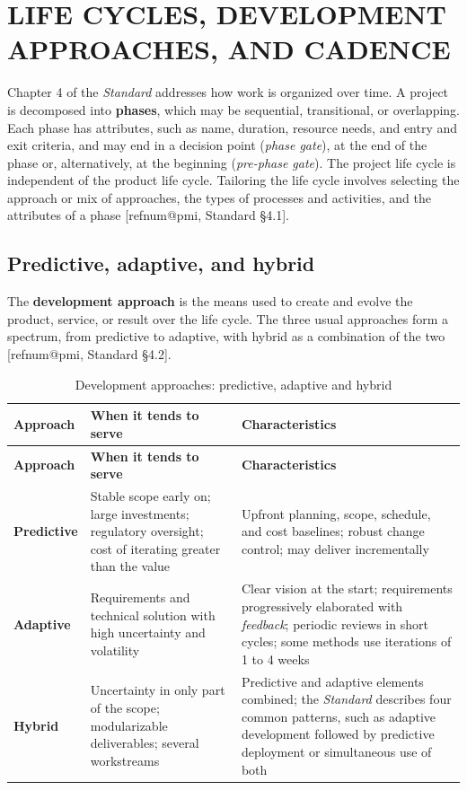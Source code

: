 \documentclass[12pt,a4paper,article,oneside,brazil,english]{abntex2}
\makeatletter
\newcommand{\fontetab}[1]{\par\vspace{3pt}{\small\noindent Source: #1\par}}
\newcommand{\refnum}[1]{\csname refnum@#1\endcsname}
\newcommand{\cit}[1]{[\refnum{#1}]}
\makeatother
\begin{document}
\section{LIFE CYCLES, DEVELOPMENT APPROACHES, AND CADENCE}

Chapter 4 of the \textit{Standard} addresses how work is organized over time. A project is decomposed into \textbf{phases}, which may be sequential, transitional, or overlapping. Each phase has attributes, such as name, duration, resource needs, and entry and exit criteria, and may end in a decision point (\textit{phase gate}), at the end of the phase or, alternatively, at the beginning (\textit{pre-phase gate}). The project life cycle is independent of the product life cycle. Tailoring the life cycle involves selecting the approach or mix of approaches, the types of processes and activities, and the attributes of a phase [\refnum{pmi}, Standard §4.1].
\subsection{Predictive, adaptive, and hybrid}

The \textbf{development approach} is the means used to create and evolve the product, service, or result over the life cycle. The three usual approaches form a spectrum, from predictive to adaptive, with hybrid as a combination of the two [\refnum{pmi}, Standard §4.2].

\begingroup\SingleSpacing\small
\begin{longtable}{@{}>{\raggedright\arraybackslash}p{}>{\raggedright\arraybackslash}p{}>{\raggedright\arraybackslash}p{}@{}}
\caption{Development approaches: predictive, adaptive and hybrid}\label{tab:t4}\\
\hline
\textbf{Approach} & \textbf{When it tends to serve} & \textbf{Characteristics}\\
\hline
\endfirsthead
\hline
\textbf{Approach} & \textbf{When it tends to serve} & \textbf{Characteristics}\\
\hline
\endhead
\hline
\endfoot
\hline
\endlastfoot
\textbf{Predictive} & Stable scope early on; large investments; regulatory oversight; cost of iterating greater than the value & Upfront planning, scope, schedule, and cost baselines; robust change control; may deliver incrementally\\[3pt]
\textbf{Adaptive} & Requirements and technical solution with high uncertainty and volatility & Clear vision at the start; requirements progressively elaborated with \textit{feedback}; periodic reviews in short cycles; some methods use iterations of 1 to 4 weeks\\[3pt]
\textbf{Hybrid} & Uncertainty in only part of the scope; modularizable deliverables; several workstreams & Predictive and adaptive elements combined; the \textit{Standard} describes four common patterns, such as adaptive development followed by predictive deployment or simultaneous use of both\\[3pt]
\end{longtable}
\endgroup
\fontetab{Prepared by the authors (2026), based on \cit{pmi}.}
\end{document}

